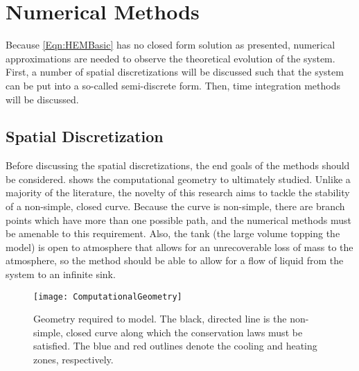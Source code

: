 \section{Numerical Methods}\label{Section:Numerics}
Because \cref{Eqn:HEMBasic} has no closed form solution as presented, numerical approximations are needed to observe the theoretical evolution of the system.
First, a number of spatial discretizations will be discussed such that the system can be put into a so-called semi-discrete form.
Then, time integration methods will be discussed.

\subsection{Spatial Discretization}\label{Subsection:SpatialDiscretization}
Before discussing the spatial discretizations, the end goals of the methods should be considered.
 shows the computational geometry to ultimately studied.
Unlike a  majority of the literature, the novelty of this research aims to tackle the stability of a non-simple, closed curve.
Because the curve is non-simple, there are branch points which have more than one possible path, and the numerical methods must be amenable to this requirement.
Also, the tank (the large volume topping the model) is open to atmosphere that allows for an unrecoverable loss of mass to the atmosphere, so the method should be able to allow for a flow of liquid from the system to an infinite sink.

\begin{figure}%
    \centering
    \caption[Geomtry to model]{Geometry required to model.  
                The black, directed line is the non-simple, closed curve along which the conservation laws must be satisfied.
                 The blue and red outlines denote the cooling and heating zones, respectively.}%
    \label{Figure:ComputationGeometry}%
    \texttt{[image: ComputationalGeometry]}%
\end{figure}


